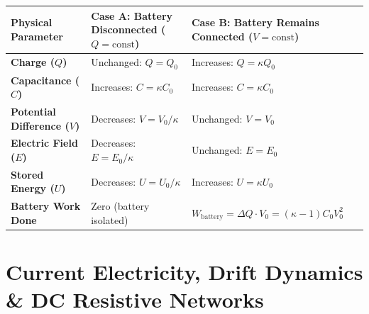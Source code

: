 \documentclass[10pt,a4paper]{article}
\begin{document}
\begin{usecasebox}
\begin{center}
\begin{tabularx}{\linewidth}{|l|Y|Y|}
\hline
\textbf{Physical Parameter} & \textbf{Case A: Battery Disconnected ($Q = \text{const}$)} & \textbf{Case B: Battery Remains Connected ($V = \text{const}$)} \\
\hline
\textbf{Charge ($Q$)} & Unchanged: $Q = Q_0$ & Increases: $Q = \kappa Q_0$ \\
\hline
\textbf{Capacitance ($C$)} & Increases: $C = \kappa C_0$ & Increases: $C = \kappa C_0$ \\
\hline
\textbf{Potential Difference ($V$)} & Decreases: $V = V_0 / \kappa$ & Unchanged: $V = V_0$ \\
\hline
\textbf{Electric Field ($E$)} & Decreases: $E = E_0 / \kappa$ & Unchanged: $E = E_0$ \\
\hline
\textbf{Stored Energy ($U$)} & Decreases: $U = U_0 / \kappa$ & Increases: $U = \kappa U_0$ \\
\hline
\textbf{Battery Work Done} & Zero (battery isolated) & $W_{\text{battery}} = \Delta Q \cdot V_0 = (\kappa - 1) C_0 V_0^2$ \\
\hline
\end{tabularx}
\end{center}
\end{usecasebox}

\section{Current Electricity, Drift Dynamics \& DC Resistive Networks}
\end{document}
